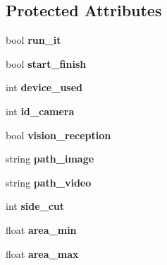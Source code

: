 \subsection*{Protected Attributes}
\begin{DoxyCompactItemize}
\item 
\hypertarget{classvision_aecb99ce2062a83e281a516779bc38e66}{bool {\bfseries run\-\_\-it}}\label{classvision_aecb99ce2062a83e281a516779bc38e66}

\item 
\hypertarget{classvision_a4bf6d1ad7886c368201f01d68cd87960}{bool {\bfseries start\-\_\-finish}}\label{classvision_a4bf6d1ad7886c368201f01d68cd87960}

\item 
\hypertarget{classvision_a4489e26964fedb334f8a11323974d1a5}{int {\bfseries device\-\_\-used}}\label{classvision_a4489e26964fedb334f8a11323974d1a5}

\item 
\hypertarget{classvision_aed0670889f7380c81cb3c6a9b0783399}{int {\bfseries id\-\_\-camera}}\label{classvision_aed0670889f7380c81cb3c6a9b0783399}

\item 
\hypertarget{classvision_a33c98ec05332bc5c29cb59b7aec7cbe9}{bool {\bfseries vision\-\_\-reception}}\label{classvision_a33c98ec05332bc5c29cb59b7aec7cbe9}

\item 
\hypertarget{classvision_a1c8c4864b8690f6146e2d383a0e26f8a}{string {\bfseries path\-\_\-image}}\label{classvision_a1c8c4864b8690f6146e2d383a0e26f8a}

\item 
\hypertarget{classvision_a277365a0346f8f7e8abfcd5dea190706}{string {\bfseries path\-\_\-video}}\label{classvision_a277365a0346f8f7e8abfcd5dea190706}

\item 
\hypertarget{classvision_ae465726320ce212e6d9ba02c98183a4c}{int {\bfseries side\-\_\-cut}}\label{classvision_ae465726320ce212e6d9ba02c98183a4c}

\item 
\hypertarget{classvision_a394274c0683ad061464939b117ef8a34}{float {\bfseries area\-\_\-min}}\label{classvision_a394274c0683ad061464939b117ef8a34}

\item 
\hypertarget{classvision_acd9de3a225e3a560cb0d25546a3dec80}{float {\bfseries area\-\_\-max}}\label{classvision_acd9de3a225e3a560cb0d25546a3dec80}


\end{DoxyCompactItemize}
